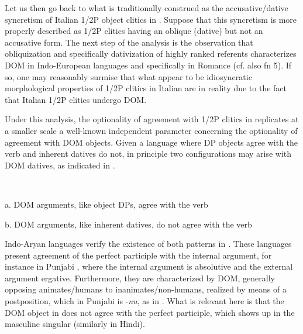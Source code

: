 \documentclass[output=paper]{langscibook}
\begin{document}
Let us then go back to what is traditionally construed as the accusative/dative syncretism of Italian 1/2P object clitics in .  Suppose that this syncretism is more properly described as 1/2P clitics having an oblique (dative) but not an accusative form. The next step of the analysis is the observation that obliquization and specifically dativization of highly ranked referents characterizes DOM in Indo-European languages and specifically in Romance (cf. also fn 5).  If so, one may reasonably surmise that what appear to be idiosyncratic morphological properties of 1/2P clitics in Italian are in reality due to the fact that Italian 1/2P clitics undergo DOM. 

Under this analysis, the optionality of agreement with 1/2P clitics in  replicates at a smaller scale a well-known independent parameter concerning the optionality of agreement with DOM objects. Given a language where DP objects agree with the verb and inherent datives do not, in principle two configurations may arise with DOM datives, as indicated in .

\ea\label{ex:manzini:}
{} \\
\z

a.  DOM arguments, like object DPs, agree with the verb



b.  DOM arguments, like inherent datives, do not agree with the verb


Indo-Aryan languages verify the existence of both patterns in \emph{.} These languages present agreement of the perfect participle with the internal argument, for instance in Punjabi , where the internal argument is absolutive and the external argument ergative. Furthermore, they are characterized by DOM, generally opposing animates/humans to inanimates/non-humans, realized by means of a postposition, which in Punjabi is -\textit{nu}, as in . What is relevant here is that the DOM object in  does not agree with the perfect participle, which shows up in the masculine singular (similarly in Hindi).

\ea\label{ex:manzini:}
{}\\
\end{document}
